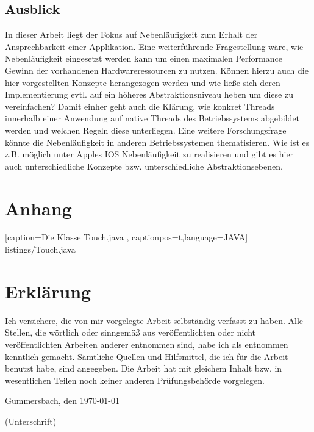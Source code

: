 \documentclass[12pt,oneside,a4paper,bibtotoc,liststotoc]{scrreprt}
\begin{document}
\section{Ausblick}%
In dieser Arbeit liegt der Fokus auf Nebenläufigkeit zum Erhalt der Ansprechbarkeit einer Applikation. Eine weiterführende Fragestellung wäre, wie Nebenläufigkeit eingesetzt werden kann um einen maximalen Performance Gewinn der vorhandenen Hardwareressourcen zu nutzen. Können hierzu auch die hier vorgestellten Konzepte herangezogen werden und wie ließe sich deren Implementierung evtl. auf ein höheres Abstraktionsniveau heben um diese zu vereinfachen? Damit einher geht auch die Klärung, wie konkret Threads innerhalb einer Anwendung auf native Threads des Betriebssystems abgebildet werden und welchen Regeln diese unterliegen. Eine weitere Forschungsfrage könnte die Nebenläufigkeit in anderen Betriebssystemen thematisieren. Wie ist es z.B. möglich unter Apples IOS Nebenläufigkeit zu realisieren und gibt es hier auch unterschiedliche Konzepte bzw. unterschiedliche Abstraktionsebenen.






{}

\appendix

\chapter*{Anhang}
 
    [caption={Die Klasse Touch.java}
       \label{lst:javaclass},
       captionpos=t,language=JAVA]
 {listings/Touch.java}
\chapter{Erklärung}

Ich versichere, die von mir vorgelegte Arbeit selbständig verfasst zu
haben. Alle Stellen, die wörtlich oder sinngemäß aus veröffentlichten
oder nicht veröffentlichten Arbeiten anderer entnommen sind, habe ich
als entnommen kenntlich gemacht. Sämtliche Quellen und Hilfsmittel,
die ich für die Arbeit benutzt habe, sind angegeben. Die Arbeit hat
mit gleichem Inhalt bzw. in wesentlichen Teilen noch keiner anderen
Prüfungsbehörde vorgelegen.

\bigskip

Gummersbach, den \today

\bigskip

\bigskip

\bigskip

\bigskip

\bigskip

\bigskip

(Unterschrift)
\end{document}
